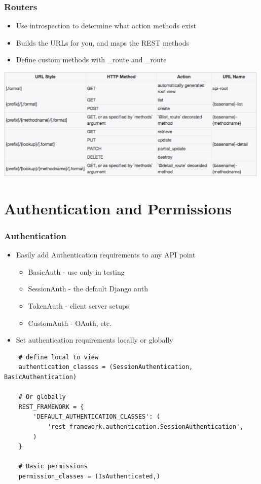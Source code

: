\documentclass{beamer}
\begin{document}
\begin{frame}[fragile]

  \frametitle{Routers}

  \begin{itemize}
  \item Use introspection to determine what action methods exist
  \item Builds the URLs for you, and maps the REST methods
  \item Define custom methods with \@list\_route and \@detail\_route
  \end{itemize}
  
  \includegraphics[width=0.99\textwidth]{images/drf_default_router.png}
  
\end{frame}

\section{Authentication and Permissions}
\begin{frame}[fragile]

  \frametitle{Authentication}

  \begin{itemize}
      \item Easily add Authentication requirements to any API point
            \begin{itemize}
                \item BasicAuth - use only in testing
                \item SessionAuth - the default Django auth
                \item TokenAuth - client server setups
                \item CustomAuth - OAuth, etc.
            \end{itemize}
      \item Set authentication requirements locally or globally
  \end{itemize}

    \begin{lstlisting}  
    # define local to view
    authentication_classes = (SessionAuthentication, BasicAuthentication)
    
    # Or globally
    REST_FRAMEWORK = {
        'DEFAULT_AUTHENTICATION_CLASSES': (
            'rest_framework.authentication.SessionAuthentication',
        )
    }    
    
    # Basic permissions
    permission_classes = (IsAuthenticated,)
    \end{lstlisting}
  
\end{frame}
\end{document}
